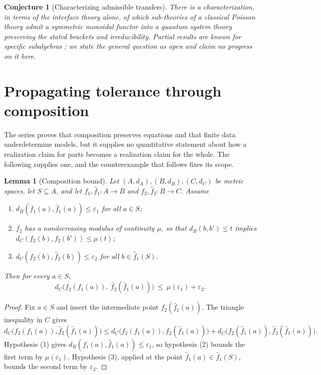 \documentclass[11pt]{article}
\newtheorem{lemma}[definition]{Lemma}
\newtheorem{conjecture}[definition]{Conjecture}
\theoremstyle{definition}
\begin{document}
\begin{conjecture}[Characterizing admissible transfers]
\label{conj:transfer}
There is a characterization, in terms of the interface theory alone, of which
sub-theories of a classical Poisson theory admit a symmetric monoidal functor
into a quantum system theory preserving the stated brackets and irreducibility.
Partial results are known for specific subalgebras \cite{Gotay}; we state the
general question as open and claim no progress on it here.
\end{conjecture}

\section{Propagating tolerance through composition}
\label{sec:compose}

The series proves that composition preserves equations and that finite data
underdetermine models, but it supplies no quantitative statement about how a
realization claim for parts becomes a realization claim for the whole. The
following supplies one, and the counterexample that follows fixes its scope.

\begin{lemma}[Composition bound]
\label{lem:comp}
Let $(A,d_A),(B,d_B),(C,d_C)$ be metric spaces, let $S\subseteq A$, and let
$f_1,\widehat f_1:A\to B$ and $f_2,\widehat f_2:B\to C$. Assume
\begin{enumerate}
\item $d_B(f_1(a),\widehat f_1(a))\le\varepsilon_1$ for all $a\in S$;
\item $f_2$ has a nondecreasing modulus of continuity $\mu$, so that
      $d_B(b,b')\le t$ implies $d_C(f_2(b),f_2(b'))\le\mu(t)$;
\item $d_C(f_2(b),\widehat f_2(b))\le\varepsilon_2$ for all $b\in\widehat f_1(S)$.
\end{enumerate}
Then for every $a\in S$,
\[
d_C\bigl(f_2(f_1(a)),\ \widehat f_2(\widehat f_1(a))\bigr)\ \le\ \mu(\varepsilon_1)+\varepsilon_2 .
\]
\end{lemma}
\begin{proof}
Fix $a\in S$ and insert the intermediate point $f_2(\widehat f_1(a))$. The
triangle inequality in $C$ gives
\[
d_C\bigl(f_2(f_1(a)),\widehat f_2(\widehat f_1(a))\bigr)
\le d_C\bigl(f_2(f_1(a)),f_2(\widehat f_1(a))\bigr)
 + d_C\bigl(f_2(\widehat f_1(a)),\widehat f_2(\widehat f_1(a))\bigr).
\]
Hypothesis (1) gives $d_B(f_1(a),\widehat f_1(a))\le\varepsilon_1$, so
hypothesis (2) bounds the first term by $\mu(\varepsilon_1)$. Hypothesis (3),
applied at the point $\widehat f_1(a)\in\widehat f_1(S)$, bounds the second term
by $\varepsilon_2$.
\end{proof}
\end{document}
